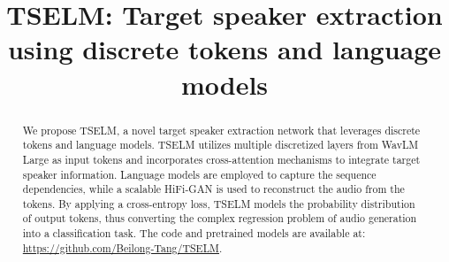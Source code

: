 \documentclass[conference]{IEEEtran}
\begin{document}
\title{TSELM: Target speaker extraction using discrete tokens and language models
}

\author{
\and
{}
\and
{}
}

\maketitle

\begin{abstract}
  We propose TSELM, a novel target speaker extraction network that leverages discrete tokens and language models. TSELM utilizes multiple discretized layers from WavLM Large as input tokens and incorporates cross-attention mechanisms to integrate target speaker information. Language models are employed to capture the sequence dependencies, while a scalable HiFi-GAN is used to reconstruct the audio from the tokens. By applying a cross-entropy loss, TSELM models the probability distribution of output tokens, thus converting the complex regression problem of audio generation into a classification task. The code and pretrained models are available at: \href{https://github.com/Beilong-Tang/TSELM}{https://github.com/Beilong-Tang/TSELM}.
\end{abstract}
\end{document}
